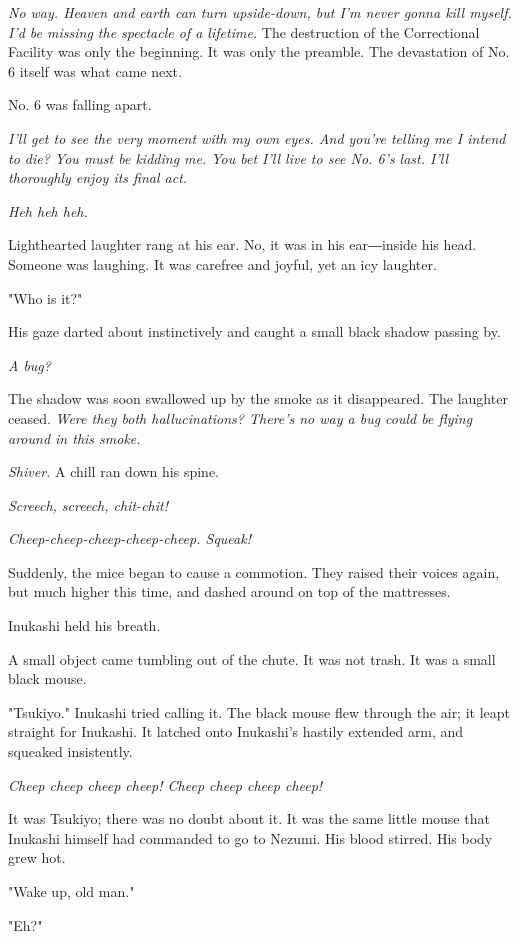 \emph{No way. Heaven and earth can turn upside-down, but I'm never gonna kill
myself. I'd be missing the spectacle of a lifetime.} The destruction of
the Correctional Facility was only the beginning. It was only the
preamble. The devastation of No. 6 itself was what came next.

No. 6 was falling apart.

\emph{I'll get to see the very moment with my own eyes. And you're telling me
I intend to die? You must be kidding me. You bet I'll live to see No.
6's last. I'll thoroughly enjoy its final act.}

\emph{Heh heh heh.}

Lighthearted laughter rang at his ear. No, it was in his ear―inside his
head. Someone was laughing. It was carefree and joyful, yet an icy
laughter.

"Who is it?"

His gaze darted about instinctively and caught a small black shadow
passing by.

\emph{A bug?}

The shadow was soon swallowed up by the smoke as it disappeared. The
laughter ceased. \emph{Were they both hallucinations? There's no way a bug
could be flying around in this smoke.}

\emph{Shiver.} A chill ran down his spine.

\emph{Screech, screech, chit-chit!}

\emph{Cheep-cheep-cheep-cheep-cheep. Squeak!}

Suddenly, the mice began to cause a commotion. They raised their voices
again, but much higher this time, and dashed around on top of the
mattresses.

Inukashi held his breath.

A small object came tumbling out of the chute. It was not trash. It was
a small black mouse.

"Tsukiyo." Inukashi tried calling it. The black mouse flew through the
air; it leapt straight for Inukashi. It latched onto Inukashi's hastily
extended arm, and squeaked insistently.

\emph{Cheep cheep cheep cheep! Cheep cheep cheep cheep!}

It was Tsukiyo; there was no doubt about it. It was the same little
mouse that Inukashi himself had commanded to go to Nezumi. His blood
stirred. His body grew hot.

"Wake up, old man."

"Eh?"


